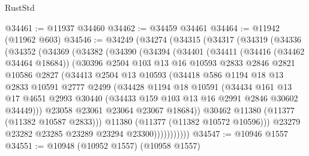 \begin{lexlean}{RustStd}
\begin{coremodule}
@34461 := @11937 @34460
@34462 := @34459 @34461
@34464 := @11942 (@11962 @603)
@34546 := @34249
    (@34274
      (@34315
        (@34317
          (@34319
            (@34336
              (@34352
                (@34369
                  (@34382
                    (@34390
                      (@34394
                        (@34401
                          (@34411
                            (@34416 (@34462 @34464 @18684))
                            (@30396
                              @2504
                              @103
                              @13
                              @16
                              @10593
                              @2833
                              @2846
                              @2821
                              @10586
                              @2827
                              (@34413
                                @2504
                                @13
                                @10593
                                (@34418
                                  @586
                                  @1194
                                  @18
                                  @13
                                  @2833
                                  @10591
                                  @2777
                                  @2499
                                  (@34428
                                    @1194
                                    @18
                                    @10591
                                    (@34434
                                      @161
                                      @13
                                      @17
                                      @4651
                                      @2993
                                      @30440
                                      (@34433 @159 @103 @13 @16 @2991 @2846 @30602 @34449)))
                                  @23058
                                  @23061
                                  @23064
                                  @23067
                                  @18684))
                              @30462
                              @11380
                              (@11377 (@11382 @10587 @2833)))
                            @11380
                            (@11377 (@11382 @10572 @10596)))
                          @23279
                          @23282
                          @23285
                          @23289
                          @23294
                          @23300)))))))))))
@34547 := @10946 @1557
@34551 := @10948 (@10952 @1557) (@10958 @1557)

\end{coremodule}
\end{lexlean}
